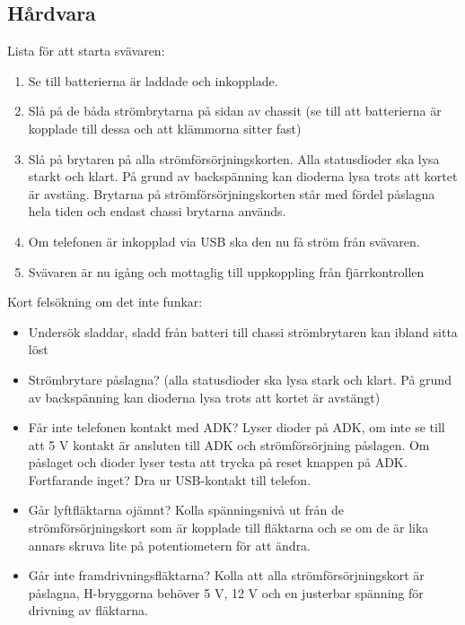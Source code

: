\subsection{Hårdvara}

Lista för att starta svävaren:
\begin{enumerate}
\item Se till batterierna är laddade och inkopplade.
\item Slå på de båda strömbrytarna på sidan av chassit (se till att batterierna är kopplade till dessa och att klämmorna sitter fast)
\item Slå på brytaren på alla strömförsörjningskorten. Alla statusdioder ska lysa starkt och klart. På grund av backspänning kan dioderna lysa trots att kortet är avstäng. Brytarna på strömförsörjningskorten står med fördel påslagna hela tiden och endast chassi brytarna används.
\item Om telefonen är inkopplad via USB ska den nu få ström från svävaren.
\item Svävaren är nu igång och mottaglig till uppkoppling från fjärrkontrollen\\
\end{enumerate}


Kort felsökning om det inte funkar:
\begin{itemize}
\item Undersök sladdar, sladd från batteri till chassi strömbrytaren kan ibland sitta löst
\item Strömbrytare påslagna? (alla statusdioder ska lysa stark och klart. På grund av backspänning kan dioderna lysa trots att kortet är avstängt)
\item Får inte telefonen kontakt med ADK? Lyser dioder på ADK, om inte se till  att 5 V kontakt är ansluten till ADK och strömförsörjning påslagen. Om påslaget och dioder lyser testa att  trycka på reset knappen på ADK. Fortfarande inget? Dra ur USB-kontakt till telefon. 
\item Går lyftfläktarna ojämnt? Kolla spänningsnivå ut från de strömförsörjningskort som är kopplade till fläktarna och se om de är lika annars skruva lite på potentiometern för att ändra.
\item Går inte framdrivningsfläktarna? Kolla att alla strömförsörjningskort är påslagna, H-bryggorna behöver 5 V, 12 V och en justerbar spänning för drivning av fläktarna.
\end{itemize}
